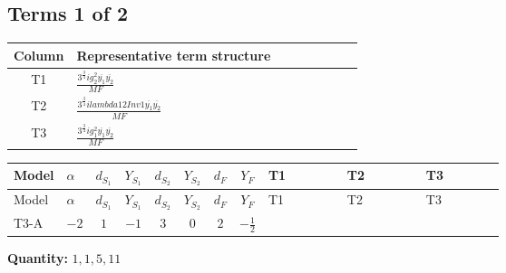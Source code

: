 \documentclass[8pt]{article}
\begin{document}
\begin{landscape}
\subsection*{Terms 1 of 2}
\begin{center}
\begin{tabular}{@{}c >{\raggedright\arraybackslash}p{0.82\linewidth}@{}}
\toprule
Column & Representative term structure \\
\midrule
T1 & \(\displaystyle \frac{3^{\frac{3}{4}} i g_{2}^{2} \overline{y_{1}} \overline{y_{2}}}{MF}\) \\
\midrule
T2 & \(\displaystyle \frac{3^{\frac{3}{4}} i lambda12Inv1 \overline{y_{1}} \overline{y_{2}}}{MF}\) \\
\midrule
T3 & \(\displaystyle \frac{3^{\frac{3}{4}} i g_{1}^{2} \overline{y_{1}} \overline{y_{2}}}{MF}\) \\
\midrule
\bottomrule
\end{tabular}
\end{center}
\smallskip
\tiny
\begin{longtable}{@{}llcccccc >{\raggedright\arraybackslash}p{0.21\linewidth} >{\raggedright\arraybackslash}p{0.21\linewidth} >{\raggedright\arraybackslash}p{0.21\linewidth}@{}}
\toprule
Model & $\alpha$ & $d_{S_1}$ & $Y_{S_1}$ & $d_{S_2}$ & $Y_{S_2}$ & $d_F$ & $Y_F$ & T1 & T2 & T3 \\
\midrule
\endfirsthead
\toprule
Model & $\alpha$ & $d_{S_1}$ & $Y_{S_1}$ & $d_{S_2}$ & $Y_{S_2}$ & $d_F$ & $Y_F$ & T1 & T2 & T3 \\
\midrule
\endhead
T3-A & $-2$ & $1$ & $-1$ & $3$ & $0$ & $2$ & $-\frac{1}{2}$ & \scriptsize\adjustbox{max width=\linewidth}{$\begin{gathered} - \frac{17 \cdot 3^{\frac{3}{4}} i g_{2}^{2} \overline{y_{1}} \overline{y_{2}}}{24 MF}\end{gathered}$} & \scriptsize\adjustbox{max width=\linewidth}{$\begin{gathered} - \frac{3^{\frac{3}{4}} i lambda12Inv1 \overline{y_{1}} \overline{y_{2}}}{6 MF}\end{gathered}$} & \scriptsize\adjustbox{max width=\linewidth}{$\begin{gathered} - \frac{3^{\frac{3}{4}} i g_{1}^{2} \overline{y_{1}} \overline{y_{2}}}{8 MF}\end{gathered}$} \\
\midrule
\bottomrule
\end{longtable}
\clearpage
\noindent\textbf{Quantity: }$\mathrm{1,1,5,11}$\par\smallskip

\end{landscape}
\end{document}
